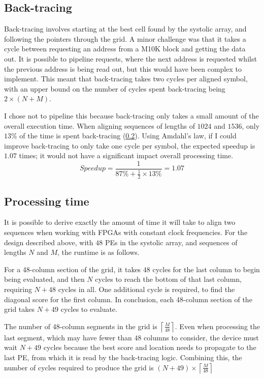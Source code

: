 \subsection{Back-tracing}
\label{sec:Back_tracing_in_SV}

Back-tracing involves starting at the best cell found by the systolic array, and following the pointers through the grid.
A minor challenge was that it takes a cycle between requesting an address from a M10K block and getting the data out.
It is possible to pipeline requests, where the next address is requested whilst the previous address is being read out, but this would have been complex to implement.
This meant that back-tracing takes two cycles per aligned symbol, with an upper bound on the number of cycles spent back-tracing being $2\times(N+M)$.

I chose not to pipeline this because back-tracing only takes a small amount of the overall execution time.
When aligning sequences of lengths of $1024$ and $1536$, only $13\%$ of the time is spent back-tracing (\cref{sec:Processing_time_on_FPGA}).
Using Amdahl’s law, if I could improve back-tracing to only take one cycle per symbol, the expected speedup is $1.07$ times; it would not have a significant impact overall processing time.
$$Speedup = \frac{1}{87\% + \frac{1}{2}\times 13\%} = 1.07 $$

\subsection{Processing time}
\label{sec:Processing_time_on_FPGA}
It is possible to derive exactly the amount of time it will take to align two sequences when working with FPGAs with constant clock frequencies.
For the design described above, with $48$ PEs in the systolic array, and sequences of lengths $N$ and $M$, the runtime is as follows.

For a 48-column section of the grid, it takes $48$ cycles for the last column to begin being evaluated, and then $N$ cycles to reach the bottom of that last column, requiring $N+48$ cycles in all.
One additional cycle is required, to find the diagonal score for the first column.
In conclusion, each 48-column section of the grid takes $N+49$ cycles to evaluate.

The number of 48-column segments in the grid is $\left \lceil \frac{M}{48} \right \rceil$.
Even when processing the last segment, which may have fewer than $48$ columns to consider, the device must wait $N+49$ cycles because the best score and location needs to propagate to the last PE, from which it is read by the back-tracing logic.
Combining this, the number of cycles required to produce the grid is ${(N+49) \times \left \lceil \frac{M}{48} \right \rceil}$

